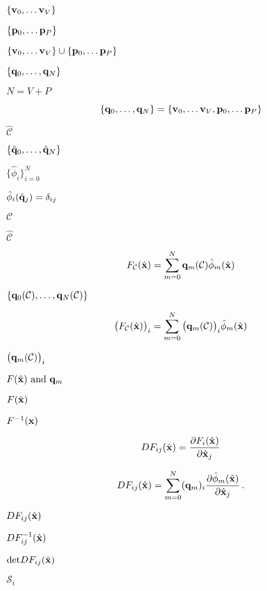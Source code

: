 \documentclass{article}
\begin{document}
$ \{ {\bf v}_0,\ldots {\bf v}_V\} $
\pagebreak

$\{ {\bf p}_0,\ldots {\bf p}_P\} $
\pagebreak

$ \{ {\bf v}_0,\ldots {\bf v}_V\}\cup \{ {\bf p}_0,\ldots {\bf p}_P\} $
\pagebreak

$\{{\bf q}_0,\ldots,{\bf q}_N\}$
\pagebreak

$N = V + P$
\pagebreak

\[ 
  \{{\bf q}_0,\ldots,{\bf q}_N\} = \{ {\bf v}_0,\ldots {\bf v}_V,{\bf p}_0,\ldots {\bf p}_P\} 
  \]
\pagebreak

$ \hat{\mathcal{C}} $
\pagebreak

$\{\hat{{\bf q}}_0,\ldots,\hat{{\bf q}}_{N}\}$
\pagebreak

$ \{\hat{\phi}_i\}_{i=0}^{N} $
\pagebreak

$ \hat{\phi}_i( \hat{{\bf q}}_j)=\delta_{ij} $
\pagebreak

$\mathcal{C}$
\pagebreak

$\hat{\mathcal{C}}$
\pagebreak

\[               
  F_\mathcal{C}(\hat{\bf x}) = \sum_{m=0}^{N}  {\bf q}_m(\mathcal{C})  \hat{\phi}_m(\hat{\bf x})          
\]
\pagebreak

$\{{\bf q}_0(\mathcal{C}),\ldots,{\bf q}_N(\mathcal{C})\}$
\pagebreak

\[        
  \big(F_{\mathcal{C}}(\hat{\bf x})\big)_i = 
              \sum_{m=0}^{N}  \big({\bf q}_m(\mathcal{C})\big)_i\hat{\phi}_m(\hat{\bf x})           
\]
\pagebreak

$ \big({\bf q}_m(\mathcal{C})\big)_i $
\pagebreak

$F(\hat{\bf x})\ \mbox{and}\ {\bf q}_m$
\pagebreak

$F(\hat{\bf x})$
\pagebreak

$F^{-1}({\bf x})$
\pagebreak

\[                    
      DF_{ij}(\hat{{\bf x}}) = \frac{\partial F_i(\hat{{\bf x}})}{\partial\hat{{\bf x}}_j}                    
\]
\pagebreak

\[  
      DF_{ij}(\hat{{\bf x}}) = \sum_{m=0}^{N}
                ({\bf q}_m)_i\frac{\partial\hat{\phi}_m(\hat{{\bf x}})}{\partial\hat{{\bf x}}_j} \,.       
\]
\pagebreak

$DF_{ij}(\hat{{\bf x}}) $
\pagebreak

$DF_{ij}^{-1}(\hat{{\bf x}}) $
\pagebreak

$\mbox{det} DF_{ij}(\hat{{\bf x}}) $
\pagebreak

$\mathcal{S}_i$
\pagebreak
\end{document}
